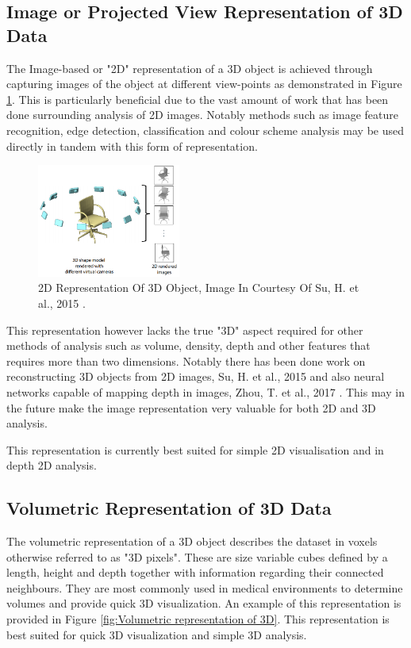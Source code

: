 \documentclass[%
]{USN-MSc}
\begin{document}
\subsection{Image or Projected View Representation of 3D Data}
\label{ssc:image}
The Image-based or "2D" representation of a 3D object is achieved through capturing images of the object at different view-points as demonstrated in Figure \ref{fig:2D representation of 3D}. This is particularly beneficial due to the vast amount of work that has been done surrounding analysis of 2D images. Notably methods such as image feature recognition, edge detection, classification and colour scheme analysis may be used directly in tandem with this form of representation.

\begin{figure}[H]
    \centering
    \includegraphics[width=0.42\textwidth]{fig/3D to 2D.png}
    \caption{2D Representation Of 3D Object, Image In Courtesy Of  Su, H. et al., 2015 \cite{2D-3D}.}
    \label{fig:2D representation of 3D}
\end{figure}

This representation however lacks the true "3D" aspect required for other methods of analysis such as volume, density, depth and other features that requires more than two dimensions. Notably there has been done work on reconstructing 3D objects from 2D images, Su, H. et al., 2015 \cite{2D-3D} and also neural networks capable of mapping depth in images, Zhou, T. et al., 2017 \cite{Depth}. This may in the future make the image representation very valuable for both 2D and 3D analysis.

This representation is currently best suited for simple 2D visualisation and in depth 2D analysis.
\clearpage
\subsection{Volumetric Representation of 3D Data}
\label{ssc:volumetric}
The volumetric representation of a 3D object describes the dataset in voxels otherwise referred to as "3D pixels". These are size variable cubes defined by a length, height and depth together with information regarding their connected neighbours. They are most commonly used in medical environments to determine volumes and provide quick 3D visualization. An example of this representation is provided in Figure \ref{fig:Volumetric representation of 3D}. This representation is best suited for quick 3D visualization and simple 3D analysis.
\end{document}
